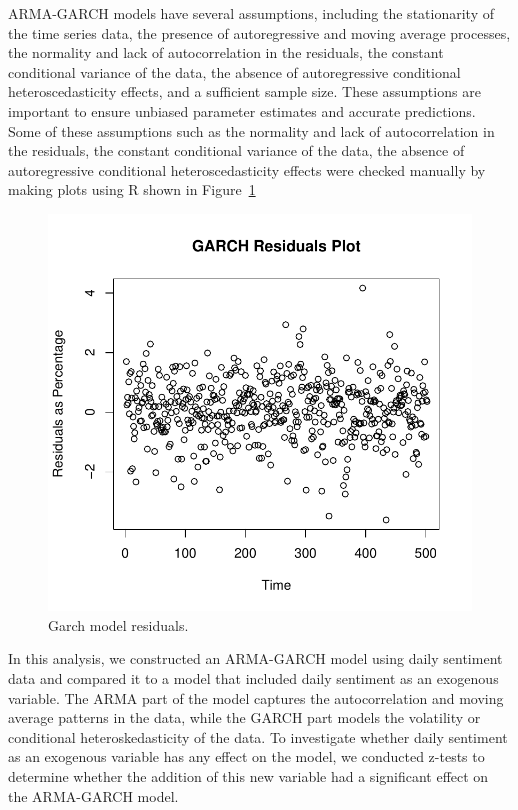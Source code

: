 \documentclass[12pt, letterpaper, titlepage]{article}
\newcommand{\jy}[1]{\textcolor{blue}{JY: #1}}
\begin{document}
ARMA-GARCH models have several assumptions, including the stationarity of the time series data, the presence of autoregressive and moving average processes, the normality and lack of autocorrelation in the residuals, the constant conditional variance of the data, the absence of autoregressive conditional heteroscedasticity effects, and a sufficient sample size. These assumptions are important to ensure unbiased parameter estimates and accurate predictions. Some of these assumptions such as the normality and lack of autocorrelation in the residuals, the constant conditional variance of the data, the absence of autoregressive conditional heteroscedasticity effects were checked manually by making plots using R shown in Figure~\ref{fig:garchvar} 

\begin{figure}[tbp]
  \begin{center}
  \includegraphics[width=\textwidth]{../figures/fig4.pdf}
  \caption{Garch model residuals.}\label{fig:garchvar}
  \end{center}
\end{figure}


In this analysis, we constructed an ARMA-GARCH model using daily sentiment data and compared it to a model that included daily sentiment as an exogenous variable. The ARMA part of the model captures the autocorrelation and moving average patterns in the data, while the GARCH part models the volatility or conditional heteroskedasticity of the data. To investigate whether daily sentiment as an exogenous variable has any effect on the model, we conducted z-tests to determine whether the addition of this new variable had a significant effect on the ARMA-GARCH model.
\end{document}
